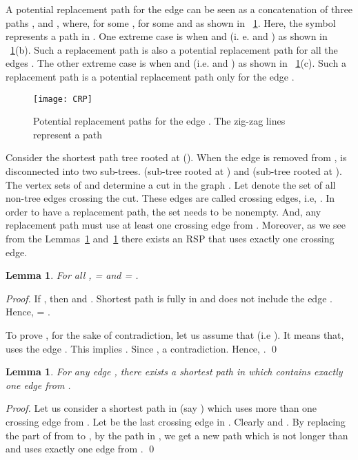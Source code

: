 \documentclass[11pt,a4paper]{llncs}
\newtheorem{lem}[thm]{Lemma}
\begin{document}
A potential replacement path for the edge  can be
seen as a concatenation of three paths ,  and , where,  for
some ,   for some  and
 as shown in \figurename~\ref{fig1}. Here, the symbol  represents a path in .
One extreme case is when  and  (i. e.  and ) as shown in \figurename~\ref{fig1}(b).
Such a replacement path is also a potential replacement path for all the edges . The other extreme case is when 
and  (i.e.  and ) as shown in \figurename~\ref{fig1}(c).
Such a replacement path is a potential replacement path only for the edge .

\begin{figure}[!ht]
\centering
\texttt{[image: CRP]}
\caption{Potential replacement paths for the edge .
The zig-zag lines represent a path} \label{fig1}
\end{figure}

Consider the shortest path tree rooted at  (). When the edge 
is removed from ,  is disconnected into two sub-trees.  (sub-tree rooted at )
and  (sub-tree rooted at ). The vertex sets of  and 
determine a cut in the graph . Let  denote the set of all non-tree edges crossing the cut.
These edges are called crossing edges, i.e,
.
In order to have a replacement path, the set  needs to be nonempty. And,
any replacement path must use at least one crossing edge from .
Moreover, as we see from the Lemmas~\ref{lemmadist} and~\ref{lemmace} there exists
an RSP that uses exactly one crossing edge.



\begin{lem}
\label{lemmadist}
For all ,  =  and  = .
\end{lem}

\begin{proof}
If , then  and .
Shortest  path is fully in  and does not include
the edge . Hence,  = .

To prove , for the sake of contradiction,
let us assume that  (i.e ).
It means that,  uses the edge .
This implies .
Since ,  a contradiction.
Hence, .
\qed
\end{proof}

\begin{lem}
\label{lemmace}
For any edge , there exists a shortest  path in 
which contains exactly one edge from .
\end{lem}

\begin{proof}
Let us consider a shortest  path in  (say ) which
uses more than one crossing edge from . Let  be the last crossing edge
in . Clearly  and . By replacing the part of  from
 to , by the  path in , we get a new path which is not
longer than  and uses exactly one edge from .
\qed
\end{proof}
\end{document}
